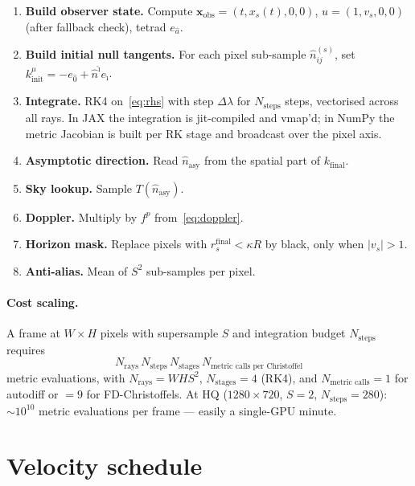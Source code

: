 \documentclass[11pt]{article}
\begin{document}
\begin{enumerate}[leftmargin=*]
\item \textbf{Build observer state.}  Compute $\bm x_{\text{obs}} = (t, x_s(t), 0, 0)$,
      $u = (1, v_s, 0, 0)$ (after fallback check), tetrad $e_{\hat a}$.
\item \textbf{Build initial null tangents.}  For each pixel sub-sample
      $\hat n_{ij}^{(s)}$, set
      $k^\mu_{\text{init}} = -e_{\hat 0} + \hat n^{\hat\imath}e_{\hat\imath}$.
\item \textbf{Integrate.}  RK4 on~\eqref{eq:rhs} with step $\Delta\lambda$
      for $N_{\text{steps}}$ steps, vectorised across all rays.  In JAX
      the integration is jit-compiled and vmap'd; in NumPy the metric
      Jacobian is built per RK stage and broadcast over the pixel axis.
\item \textbf{Asymptotic direction.}  Read $\hat n_{\text{asy}}$ from the spatial
      part of $k_{\text{final}}$.
\item \textbf{Sky lookup.}  Sample $T(\hat n_{\text{asy}})$.
\item \textbf{Doppler.}  Multiply by $f^p$ from~\eqref{eq:doppler}.
\item \textbf{Horizon mask.}  Replace pixels with $r_s^{\text{final}} < \kappa R$
      by black, only when $|v_s|>1$.
\item \textbf{Anti-alias.}  Mean of $S^2$ sub-samples per pixel.
\end{enumerate}

\paragraph{Cost scaling.}
A frame at $W\!\times\!H$ pixels with supersample $S$ and integration
budget $N_{\text{steps}}$ requires
\begin{equation}
N_{\text{rays}}\,N_{\text{steps}}\,N_{\text{stages}}\,N_{\text{metric calls per Christoffel}}
\end{equation}
metric evaluations, with $N_{\text{rays}}=WHS^2$, $N_{\text{stages}}=4$ (RK4),
and $N_{\text{metric calls}}\!=\!1$ for autodiff or $\!=\!9$ for FD-Christoffels.
At HQ ($1280\!\times\!720$, $S=2$, $N_{\text{steps}}=280$): $\sim 10^{10}$
metric evaluations per frame — easily a single-GPU minute.

\section{Velocity schedule}
\end{document}
